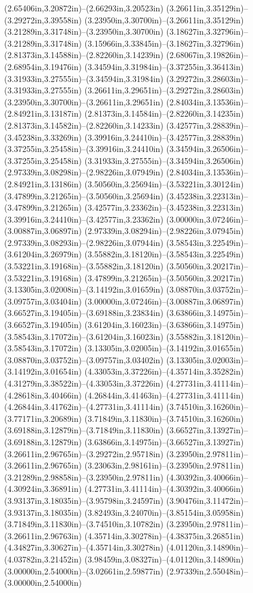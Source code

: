 (2.65406in,3.20872in)--(2.66293in,3.20523in) (3.26611in,3.35129in)--(3.29272in,3.39558in) (3.23950in,3.30700in)--(3.26611in,3.35129in) (3.21289in,3.31748in)--(3.23950in,3.30700in) (3.18627in,3.32796in)--(3.21289in,3.31748in) (3.15966in,3.33845in)--(3.18627in,3.32796in) (2.81373in,3.14588in)--(2.82260in,3.14239in) (2.68067in,3.19826in)--(2.68954in,3.19476in) (3.34594in,3.31984in)--(3.37255in,3.36413in) (3.31933in,3.27555in)--(3.34594in,3.31984in) (3.29272in,3.28603in)--(3.31933in,3.27555in) (3.26611in,3.29651in)--(3.29272in,3.28603in) (3.23950in,3.30700in)--(3.26611in,3.29651in) (2.84034in,3.13536in)--(2.84921in,3.13187in) (2.81373in,3.14584in)--(2.82260in,3.14235in) (2.81373in,3.14582in)--(2.82260in,3.14233in) (3.42577in,3.28839in)--(3.45238in,3.33269in) (3.39916in,3.24410in)--(3.42577in,3.28839in) (3.37255in,3.25458in)--(3.39916in,3.24410in) (3.34594in,3.26506in)--(3.37255in,3.25458in) (3.31933in,3.27555in)--(3.34594in,3.26506in) (2.97339in,3.08298in)--(2.98226in,3.07949in) (2.84034in,3.13536in)--(2.84921in,3.13186in) (3.50560in,3.25694in)--(3.53221in,3.30124in) (3.47899in,3.21265in)--(3.50560in,3.25694in) (3.45238in,3.22313in)--(3.47899in,3.21265in) (3.42577in,3.23362in)--(3.45238in,3.22313in) (3.39916in,3.24410in)--(3.42577in,3.23362in) (3.00000in,3.07246in)--(3.00887in,3.06897in) (2.97339in,3.08294in)--(2.98226in,3.07945in) (2.97339in,3.08293in)--(2.98226in,3.07944in) (3.58543in,3.22549in)--(3.61204in,3.26979in) (3.55882in,3.18120in)--(3.58543in,3.22549in) (3.53221in,3.19168in)--(3.55882in,3.18120in) (3.50560in,3.20217in)--(3.53221in,3.19168in) (3.47899in,3.21265in)--(3.50560in,3.20217in) (3.13305in,3.02008in)--(3.14192in,3.01659in) (3.08870in,3.03752in)--(3.09757in,3.03404in) (3.00000in,3.07246in)--(3.00887in,3.06897in) (3.66527in,3.19405in)--(3.69188in,3.23834in) (3.63866in,3.14975in)--(3.66527in,3.19405in) (3.61204in,3.16023in)--(3.63866in,3.14975in) (3.58543in,3.17072in)--(3.61204in,3.16023in) (3.55882in,3.18120in)--(3.58543in,3.17072in) (3.13305in,3.02005in)--(3.14192in,3.01655in) (3.08870in,3.03752in)--(3.09757in,3.03402in) (3.13305in,3.02003in)--(3.14192in,3.01654in) (4.33053in,3.37226in)--(4.35714in,3.35282in) (4.31279in,3.38522in)--(4.33053in,3.37226in) (4.27731in,3.41114in)--(4.28618in,3.40466in) (4.26844in,3.41463in)--(4.27731in,3.41114in) (4.26844in,3.41762in)--(4.27731in,3.41114in) (3.74510in,3.16260in)--(3.77171in,3.20689in) (3.71849in,3.11830in)--(3.74510in,3.16260in) (3.69188in,3.12879in)--(3.71849in,3.11830in) (3.66527in,3.13927in)--(3.69188in,3.12879in) (3.63866in,3.14975in)--(3.66527in,3.13927in) (3.26611in,2.96765in)--(3.29272in,2.95718in) (3.23950in,2.97811in)--(3.26611in,2.96765in) (3.23063in,2.98161in)--(3.23950in,2.97811in) (3.21289in,2.98858in)--(3.23950in,2.97811in) (4.30392in,3.40066in)--(4.30924in,3.36891in) (4.27731in,3.41114in)--(4.30392in,3.40066in) (3.93137in,3.18035in)--(3.95798in,3.24597in) (3.90476in,3.11472in)--(3.93137in,3.18035in) (3.82493in,3.24070in)--(3.85154in,3.05958in) (3.71849in,3.11830in)--(3.74510in,3.10782in) (3.23950in,2.97811in)--(3.26611in,2.96763in) (4.35714in,3.30278in)--(4.38375in,3.26851in) (4.34827in,3.30627in)--(4.35714in,3.30278in) (4.01120in,3.14890in)--(4.03782in,3.21452in) (3.98459in,3.08327in)--(4.01120in,3.14890in) (3.00000in,2.54000in)--(3.02661in,2.59877in) (2.97339in,2.55048in)--(3.00000in,2.54000in) 